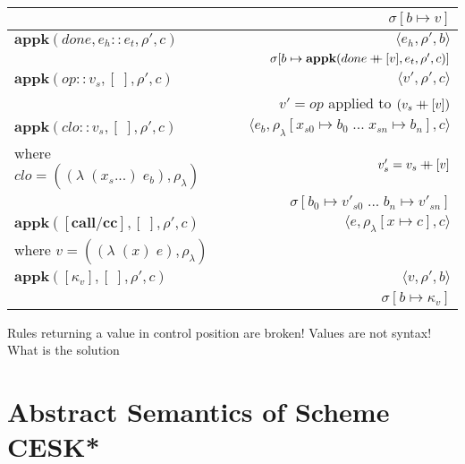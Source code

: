 \documentclass[12pt,draft]{article}
\newcommand\mdoubleplus{\ensuremath{\mathbin{+\mkern-9mu+}}}
\newcommand{\lamsyn}[2]{(\lambda\;(#1 ...)\;#2)}
\newcommand{\singlelamsyn}[2]{(\lambda\;(#1)\;#2)}
\begin{document}
\begin{center}
\begin{tabular}{@{}l | r@{}}
& $ \sigma[b \mapsto v] $ \\
\hline
$ \textbf{appk}(done, e_h::e_t , \rho' , c) $
& $\langle e_h , \rho' , b \rangle$ \\
& $ \sigma[b \mapsto \textbf{appk}(done \mdoubleplus [v] , e_t , \rho' , c)] $ \\
\hline
$ \textbf{appk}(op :: v_s , [\;] , \rho' , c) $
& $\langle v' , \rho' , c \rangle$ \\
& $ v' = op $ applied to $(v_s \mdoubleplus [v])$ \\
\hline
$ \textbf{appk}(clo :: v_s, [\;] , \rho' , c) $
& $\langle e_b , \rho_{\lambda}[x_{s0} \mapsto b_0 \;...\; x_{sn} \mapsto b_n] , c \rangle$ \\
where $ clo = (\lamsyn{x_s}{e_b} , \rho_{\lambda}) $ & $ v'_s = v_s \mdoubleplus [v] $ \\
& $ \sigma[b_0 \mapsto v'_{s0} \;...\; b_n \mapsto v'_{sn}] $  \\
\hline
$\textbf{appk}([\textbf{call/cc}] , [\;] , \rho' , c)$
&$\langle
e , \rho_{\lambda}[x \mapsto c] , c
\rangle$ \\
where $v = (\singlelamsyn{x}{e} , \rho_{\lambda})$\\
\hline
$\textbf{appk}([\kappa_v] , [\;] , \rho' , c)$
&$\langle
v , \rho' , b
\rangle$\\
&$\sigma[b \mapsto \kappa_v]$ \\
\hline
\end{tabular}
\end{center}

Rules returning a value in control position are broken!
Values are not syntax! What is the solution\textinterrobang

\newpage

\section{Abstract Semantics of Scheme CESK*}
\end{document}
